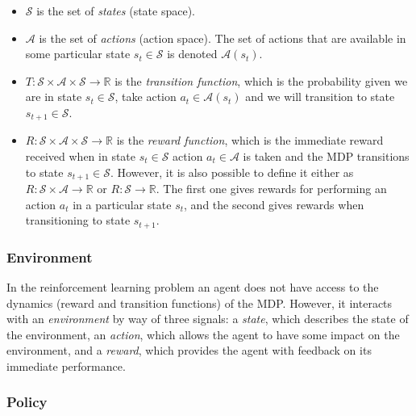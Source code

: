 \documentclass[a4paper]{article}
\begin{document}
\begin{itemize}

    \item $\mathcal{S}$ is the set of \emph{states} (state space).

    \item $\mathcal{A}$ is the set of \emph{actions} (action space). The set of actions that are available in some particular state $s_t \in \mathcal{S}$ is denoted $\mathcal{A}(s_t)$.

    \item $ T : \mathcal{S} \times \mathcal{A} \times \mathcal{S} \to \mathbb{R}$ is the \emph{transition function}, which is the probability given we are in state $s_t \in \mathcal{S}$, take action $a_t \in \mathcal{A}(s_t)$ and we will transition to state $s_{t+1} \in \mathcal{S}$.

    \item $ R : \mathcal{S} \times \mathcal{A} \times \mathcal{S} \to \mathbb{R}$ is the \emph{reward function}, which is the immediate reward received when in state $s_t \in  \mathcal{S}$ action $a_t \in \mathcal{A}$ is taken and the MDP transitions to state $s_{t+1} \in \mathcal{S}$. However, it is also possible to define it either as $ R : \mathcal{S} \times \mathcal{A} \to \mathbb{R}$ or $R : \mathcal{S} \to \mathbb{R}$. The first one gives rewards for performing an action $a_t$ in a particular state $s_t$, and the second gives rewards when transitioning to state $s_{t+1}$.

\end{itemize}

\subsubsection{Environment}

In the reinforcement learning problem an agent does not have access to the dynamics (reward and transition functions) of the MDP. However, it interacts with an \emph{environment} by way of three signals: a \emph{state}, which describes the state of the environment, an \emph{action}, which allows the agent to have some impact on the environment, and a \emph{reward}, which provides the agent with feedback on its immediate performance.

\subsubsection{Policy}
\end{document}
